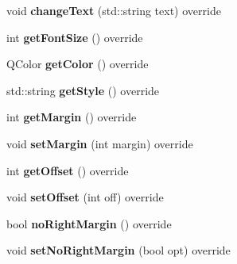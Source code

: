 \begin{DoxyCompactItemize}
\item 
\hypertarget{class_student_1_1_label_a0157aa986655489ea0e66435b2c844bd}{void {\bfseries change\-Text} (std\-::string text) override}\label{class_student_1_1_label_a0157aa986655489ea0e66435b2c844bd}

\item 
\hypertarget{class_student_1_1_label_ad90cd3456074da732c163e3ca880ddfd}{int {\bfseries get\-Font\-Size} () override}\label{class_student_1_1_label_ad90cd3456074da732c163e3ca880ddfd}

\item 
\hypertarget{class_student_1_1_label_a2655ca8be12768f402680dbacc94cc5e}{Q\-Color {\bfseries get\-Color} () override}\label{class_student_1_1_label_a2655ca8be12768f402680dbacc94cc5e}

\item 
\hypertarget{class_student_1_1_label_ae5942204f3df6e188edb4f429335b3b2}{std\-::string {\bfseries get\-Style} () override}\label{class_student_1_1_label_ae5942204f3df6e188edb4f429335b3b2}

\item 
\hypertarget{class_student_1_1_label_a33133a19b5ff5ed4745fac20e3b55876}{int {\bfseries get\-Margin} () override}\label{class_student_1_1_label_a33133a19b5ff5ed4745fac20e3b55876}

\item 
\hypertarget{class_student_1_1_label_a9d9ba02c5f858242f83c7a4e49ac4e4e}{void {\bfseries set\-Margin} (int margin) override}\label{class_student_1_1_label_a9d9ba02c5f858242f83c7a4e49ac4e4e}

\item 
\hypertarget{class_student_1_1_label_ab10426b206a23eb249815287fb101704}{int {\bfseries get\-Offset} () override}\label{class_student_1_1_label_ab10426b206a23eb249815287fb101704}

\item 
\hypertarget{class_student_1_1_label_a3d3f67dc23fe3e471846bbe5898d6c40}{void {\bfseries set\-Offset} (int off) override}\label{class_student_1_1_label_a3d3f67dc23fe3e471846bbe5898d6c40}

\item 
\hypertarget{class_student_1_1_label_a31ee862cadb4849c859198fc47a6a8cd}{bool {\bfseries no\-Right\-Margin} () override}\label{class_student_1_1_label_a31ee862cadb4849c859198fc47a6a8cd}

\item 
\hypertarget{class_student_1_1_label_af6633a174b336919f38d4baf7f8388c4}{void {\bfseries set\-No\-Right\-Margin} (bool opt) override}\label{class_student_1_1_label_af6633a174b336919f38d4baf7f8388c4}

\end{DoxyCompactItemize}
